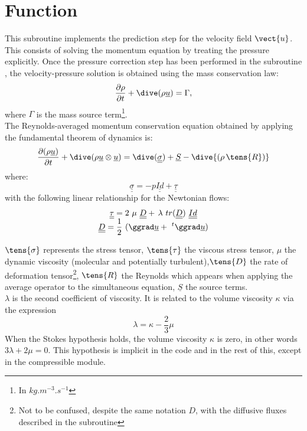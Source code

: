 \section*{Function}
This subroutine implements the prediction step for the velocity field $\vect{u}$.
This consists of solving the momentum equation by treating the pressure explicitly.
Once the pressure correction step has been performed in the subroutine ,
the velocity-pressure solution is obtained using the mass conservation law:
\begin{equation}
\frac{\partial \rho } {\partial t}+ \dive(\rho \underline{u}) = \Gamma,
\end{equation}
where $\Gamma$ is the mass source term\footnote{In $kg.m^{-3}.s^{-1}$ }.\\
The Reynolds-averaged momentum conservation equation obtained by applying
the fundamental theorem of dynamics is:
\begin{equation}
\frac {\partial (\rho \underline {u})} {\partial t }+
\dive(\rho \underline{u} \otimes \underline{u}) =
\dive(\underline{\underline{\sigma}}) + \underline{S} - \dive{(\rho\,\tens{R})}\end{equation}
where:
\begin{equation}
\underline{\underline{\sigma}} = - p \underline{\underline{Id}} + \underline{\underline{\tau }}
\end{equation}
with the following linear relationship for the Newtonian flows:
\begin{equation}
\begin{array}{lcl}
&\displaystyle \underline{\underline{\tau}} = 2\ \mu\ \underline{\underline{D}}
+\,
 \lambda\ tr(\underline{\underline{D }})\ \underline{\underline{Id}} &\\
&\displaystyle \underline{\underline{D}}=\frac{1}{2}\ (\ggrad \underline
{u} +\ ^t\ggrad \underline {u})
\end{array}
\end{equation}


$\tens{\sigma}$ represents the stress tensor, $\tens{\tau}$ the viscous stress tensor,
$\mu$ the dynamic viscosity (molecular and potentially turbulent),$\tens{D}$
the rate of deformation tensor\footnote{Not to be confused, despite the same
notation $D$, with the diffusive fluxes described in the subroutine
}, $\tens{R}$ the Reynolds which appears when applying the
average operator to the simultaneous equation, $\underline{S}$ the source
terms.\\
$\lambda$ is the second coefficient of viscosity. It is related to the volume viscosity
 $\kappa$ via the expression
\begin{equation}
\lambda=\kappa-\frac{2}{3}\mu
\end{equation}
When the Stokes hypothesis holds, the volume viscosity $\kappa$ is
zero, in other words $3\lambda+2\mu=0$. This hypothesis is implicit in the code
and in the rest of this, except in the compressible module.\\


